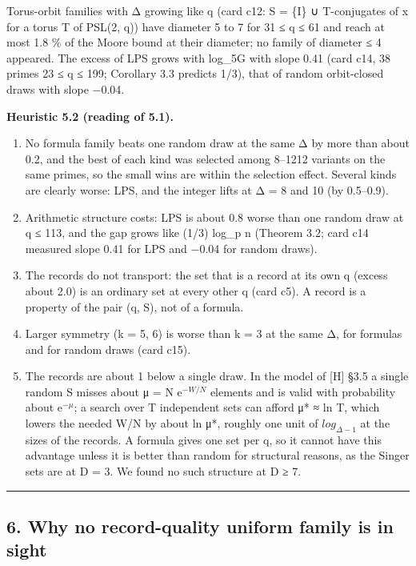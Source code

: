 \documentclass[
  10pt,
]{article}
\providecommand{\tightlist}{%
  \setlength{\itemsep}{0pt}\setlength{\parskip}{0pt}}
\begin{document}
Torus-orbit families with Δ growing like q (card c12: S = \{I\} ∪
T-conjugates of x for a torus T of PSL(2, q)) have diameter 5 to 7 for
31 ≤ q ≤ 61 and reach at most 1.8 \% of the Moore bound at their
diameter; no family of diameter ≤ 4 appeared. The excess of LPS grows
with log\_5\textbar G\textbar{} with slope 0.41 (card c14, 38 primes 23
≤ q ≤ 199; Corollary 3.3 predicts 1/3), that of random orbit-closed
draws with slope −0.04.

\textbf{Heuristic 5.2 (reading of 5.1).}

\begin{enumerate}
\def\labelenumi{\arabic{enumi}.}
\tightlist
\item
  No formula family beats one random draw at the same Δ by more than
  about 0.2, and the best of each kind was selected among 8--1212
  variants on the same primes, so the small wins are within the
  selection effect. Several kinds are clearly worse: LPS, and the
  integer lifts at Δ = 8 and 10 (by 0.5--0.9).
\item
  Arithmetic structure costs: LPS is about 0.8 worse than one random
  draw at q ≤ 113, and the gap grows like (1/3) log\_p n (Theorem 3.2;
  card c14 measured slope 0.41 for LPS and −0.04 for random draws).
\item
  The records do not transport: the set that is a record at its own q
  (excess about 2.0) is an ordinary set at every other q (card c5). A
  record is a property of the pair (q, S), not of a formula.
\item
  Larger symmetry (k = 5, 6) is worse than k = 3 at the same Δ, for
  formulas and for random draws (card c15).
\item
  The records are about 1 below a single draw. In the model of {[}H{]}
  §3.5 a single random S misses about μ = N e\(^{−W/N}\) elements and is
  valid with probability about e\(^{−μ}\); a search over T independent
  sets can afford μ* ≈ ln T, which lowers the needed W/N by about ln μ*,
  roughly one unit of \(log_{Δ−1}\) at the sizes of the records. A
  formula gives one set per q, so it cannot have this advantage unless
  it is better than random for structural reasons, as the Singer sets
  are at D = 3. We found no such structure at D ≥ 7.
\end{enumerate}

\begin{center}\rule{0.5\linewidth}{0.5pt}\end{center}

\hypertarget{why-no-record-quality-uniform-family-is-in-sight}{%
\subsection{6. Why no record-quality uniform family is in
sight}\label{why-no-record-quality-uniform-family-is-in-sight}}
\end{document}
